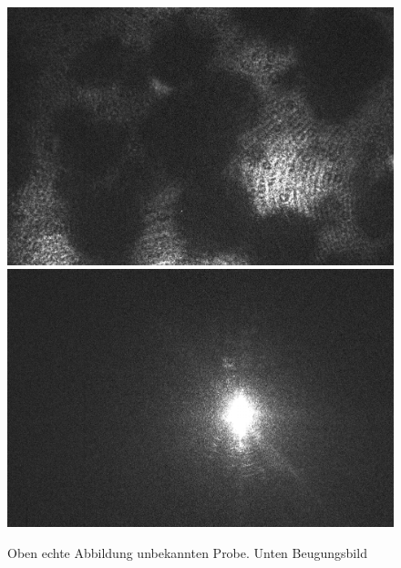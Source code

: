 \begin{figure}[h]
	\centering
	\includegraphics[width=\textwidth]{Daten/bio_1.jpg}
	\includegraphics[width=\textwidth]{Daten/bio_2.jpg}
	\caption[Aufnahme biologische Probe]{Oben echte Abbildung unbekannten Probe. Unten Beugungsbild}
\end{figure}
